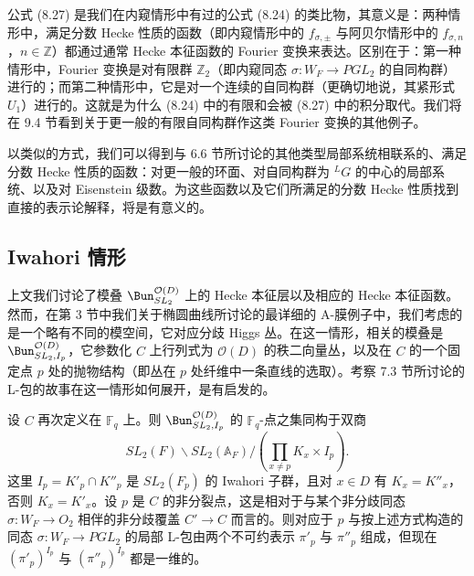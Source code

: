 公式 (8.27) 是我们在内窥情形中有过的公式 (8.24) 的类比物，其意义是：两种情形中，满足分数 Hecke 性质的函数（即内窥情形中的 $f_{\sigma,\pm}$ 与阿贝尔情形中的 $f_{\sigma,n}$，$n\in\mathbb{Z}$）都通过通常 Hecke 本征函数的 Fourier 变换来表达。区别在于：第一种
情形中，Fourier 变换是对有限群 $\mathbb{Z}_2$（即内窥同态 $\sigma : W_F \to PGL_2$ 的自同构群）进行的；而第二种情形中，它是对一个连续的自同构群（更确切地说，其紧形式 $U_1$）进行的。这就是为什么 (8.24) 中的有限和会被 (8.27) 中的积分取代。我们将在 9.4 节看到关于更一般的有限自同构群作这类 Fourier 变换的其他例子。


以类似的方式，我们可以得到与 6.6 节所讨论的其他类型局部系统相联系的、满足分数 Hecke 性质的函数：对更一般的环面、对自同构群为 ${}^{L}G$ 的中心的局部系统、以及对 Eisenstein 级数。为这些函数以及它们所满足的分数 Hecke 性质找到直接的表示论解释，将是有意义的。

\subsection{Iwahori 情形}

上文我们讨论了模叠 $\Bun^{\mathcal{O}(D)}_{SL_2}$ 上的 Hecke 本征层以及相应的 Hecke 本征函数。然而，在第 3 节中我们关于椭圆曲线所讨论的最详细的 A-膜例子中，我们考虑的是一个略有不同的模空间，它对应分歧 Higgs 丛。在这一情形，相关的模叠是 $\Bun^{\mathcal{O}(D)}_{SL_2,I_p}$，它参数化 $C$ 上行列式为 $\mathcal{O}(D)$ 的秩二向量丛，以及在 $C$ 的一个固定点 $p$ 处的抛物结构（即丛在 $p$ 处纤维中一条直线的选取）。考察 7.3 节所讨论的 L-包的故事在这一情形如何展开，是有启发的。

设 $C$ 再次定义在 $\mathbb{F}_q$ 上。则 $\Bun^{\mathcal{O}(D)}_{SL_2,I_p}$ 的 $\mathbb{F}_q$-点之集同构于双商
\begin{equation}\tag{8.28}
SL_2(F)\backslash SL_2(\mathbb{A}_F)\Big/\left(\prod_{x\neq p} K_x\times I_p\right).
\end{equation}
这里 $I_p = K'_p\cap K''_p$ 是 $SL_2(F_p)$ 的 Iwahori 子群，且对 $x\in D$ 有 $K_x = K''_x$，否则 $K_x = K'_x$。设 $p$ 是 $C$ 的非分裂点，这是相对于与某个非分歧同态 $\sigma : W_F \to O_2$ 相伴的非分歧覆盖 $C'\to C$ 而言的。则对应于 $p$ 与按上述方式构造的同态 $\sigma : W_F \to PGL_2$ 的局部 L-包由两个不可约表示 $\pi'_p$ 与 $\pi''_p$ 组成，但现在 $(\pi'_p)^{I_p}$ 与 $(\pi''_p)^{I_p}$ 都是一维的。

